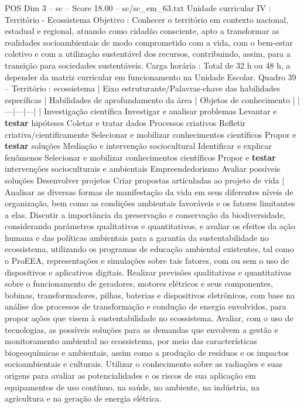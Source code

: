\begin{textsample}{POS Dim 3 – sc – Score 18.00 – sc/sc\_em\_63.txt}
Unidade curricular IV : Território - Ecossistema Objetivo : Conhecer o território em contexto nacional, estadual e regional, atuando como cidadão consciente, apto a transformar as realidades socioambientais de modo comprometido com a vida, com o bem-estar coletivo e com a utilização sustentável dos recursos, contribuindo, assim, para a transição para sociedades sustentáveis.
Carga horária : Total de 32 h ou 48 h, a depender da matriz curricular em funcionamento na Unidade Escolar.
Quadro 39 – Território : ecossistema | Eixo estruturante/Palavras-chave das habilidades específicas | Habilidades de aprofundamento da área | Objetos de conhecimento | |---|---|---| | Investigação científica Investigar e analisar problemas Levantar e \textbf{testar} hipóteses Coletar e tratar dados Processos criativos Refletir criativa/cientificamente Selecionar e mobilizar conhecimentos científicos Propor e \textbf{testar} soluções Mediação e intervenção sociocultural Identificar e explicar fenômenos Selecionar e mobilizar conhecimentos científicos Propor e \textbf{testar} intervenções socioculturais e ambientais Empreendedorismo Avaliar possíveis soluções Desenvolver projetos Criar propostas articuladas ao projeto de vida | Analisar as diversas formas de manifestação da vida em seus diferentes níveis de organização, bem como as condições ambientais favoráveis e os fatores limitantes a elas.
Discutir a importância da preservação e conservação da biodiversidade, considerando parâmetros qualitativos e quantitativos, e avaliar os efeitos da ação humana e das políticas ambientais para a garantia da sustentabilidade no ecossistema, utilizando os programas de educação ambiental existentes, tal como o ProEEA, representações e simulações sobre tais fatores, com ou sem o uso de dispositivos e aplicativos digitais.
Realizar previsões qualitativas e quantitativas sobre o funcionamento de geradores, motores elétricos e seus componentes, bobinas, transformadores, pilhas, baterias e dispositivos eletrônicos, com base na análise dos processos de transformação e condução de energia envolvidos, para propor ações que visem à sustentabilidade no ecossistema.
Avaliar, com o uso de tecnologias, as possíveis soluções para as demandas que envolvem a gestão e monitoramento ambiental no ecossistema, por meio das características biogeoquímicas e ambientais, assim como a produção de resíduos e os impactos socioambientais e culturais.
Utilizar o conhecimento sobre as radiações e suas origens para avaliar as potencialidades e os riscos de sua aplicação em equipamentos de uso contínuo, na saúde, no ambiente, na indústria, na agricultura e na geração de energia elétrica.

\end{textsample}
